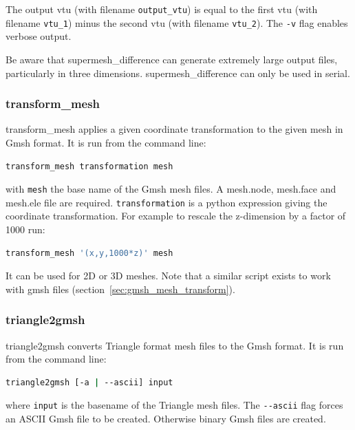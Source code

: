The output vtu (with filename \lstinline[language = Bash]+output_vtu+)
is equal to the first vtu (with filename \lstinline[language = Bash]+vtu_1+)
minus the second vtu (with filename \lstinline[language = Bash]+vtu_2+).  The
\lstinline[language = Bash]+-v+ flag enables verbose output.

Be aware that supermesh\_difference can generate extremely large output files,
particularly in three dimensions. supermesh\_difference can only be used in
serial.


\subsubsection{transform\_mesh}
\label{sec:transform_mesh}

transform\_mesh applies a given coordinate transformation to the given mesh in Gmsh format. It is run from the command line:
\begin{lstlisting}[language = Bash]
transform_mesh transformation mesh
\end{lstlisting}
with \lstinline[language = Bash]+mesh+ the base name of the Gmsh mesh files. A mesh.node, mesh.face and mesh.ele file are required. \lstinline[language = Bash]+transformation+ is a python expression giving the coordinate transformation. For example to rescale the z-dimension by a factor of 1000 run:
\begin{lstlisting}[language = Bash]
transform_mesh '(x,y,1000*z)' mesh
\end{lstlisting}
It can be used for 2D or 3D meshes. Note that a similar script exists to work with gmsh files (section~\ref{sec:gmsh_mesh_transform}).


\subsubsection{triangle2gmsh}
\label{sec:triangle2gmsh}
triangle2gmsh converts Triangle format mesh files to the Gmsh format.
It is run from the command line:
\begin{lstlisting}[language = Bash]
triangle2gmsh [-a | --ascii] input
\end{lstlisting}
where \lstinline[language = Bash]+input+ is the basename of the Triangle mesh files.
The \lstinline[language = Bash]+--ascii+ flag forces an ASCII Gmsh file to be created. Otherwise binary Gmsh files are created.

